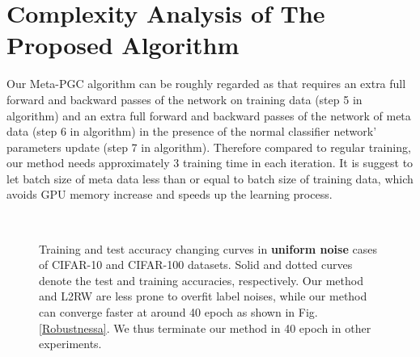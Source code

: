 \documentclass{article}
\begin{document}
	
	\section{Complexity Analysis of The Proposed Algorithm}
	Our Meta-PGC algorithm can be roughly regarded as that requires an extra full forward and backward passes of the network on training data (step 5 in algorithm) and an extra full forward and backward passes of the network of meta data (step 6 in algorithm) in the presence of the normal classifier network' parameters update (step 7 in algorithm). Therefore compared to regular training, our method needs approximately 3  training time in each iteration. It is suggest to let batch size of meta data less than or equal to batch size of training data, which avoids GPU memory increase and speeds up the learning process.
	
	\begin{figure}[t]
		\centering
		\vspace{0mm} \\
		\vspace{0mm}
		\caption{Training and test accuracy changing curves in \textbf{uniform noise} cases of CIFAR-10 and CIFAR-100 datasets. Solid and dotted curves denote the test and training accuracies, respectively. Our method and L2RW are less prone to overfit label noises, while our method can converge faster at around 40 epoch as shown in Fig. \ref{Robustnessa}. We thus terminate our method in 40 epoch in other experiments.} \vspace{-4mm}
		\label{Robustness} \end{figure}
	
\end{document}
